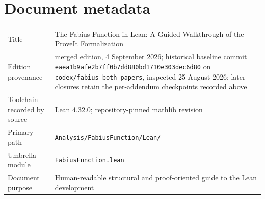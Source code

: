 \documentclass[11pt,oneside]{article}
\theoremstyle{definition}
\theoremstyle{remark}
\begin{document}
\section*{Document metadata}
\thispagestyle{plain}
\begin{tabularx}{\textwidth}{@{}lX@{}}
\toprule
Title & The Fabius Function in Lean: A Guided Walkthrough of the ProveIt Formalization \\
Edition provenance & merged edition, 4 September 2026; historical baseline commit \nolinkurl{eaea1b9afe2b7ff0b7dd880bd1710e303dec6d80} on \texttt{codex/fabius-both-papers}, inspected 25 August 2026; later closures retain the per-addendum checkpoints recorded above \\
Toolchain recorded by source & Lean 4.32.0; repository-pinned mathlib revision \\
Primary path & \nolinkurl{Analysis/FabiusFunction/Lean/} \\
Umbrella module & \nolinkurl{FabiusFunction.lean} \\
Document purpose & Human-readable structural and proof-oriented guide to the Lean development \\
\bottomrule
\end{tabularx}
\end{document}
